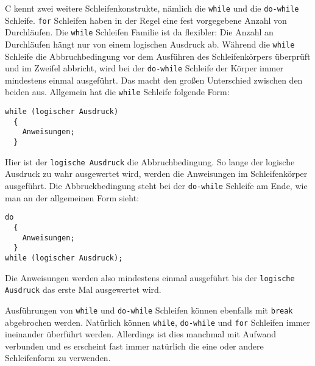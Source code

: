 C kennt zwei weitere Schleifenkonstrukte, nämlich die \verb|while| und die \verb|do-while| Schleife.
\texttt{for} Schleifen haben in der Regel eine fest vorgegebene Anzahl von Durchläufen.
Die \texttt{while} Schleifen Familie ist da flexibler: Die Anzahl an Durchläufen hängt nur von einem logischen Ausdruck ab.
Während die \verb|while| Schleife die Abbruchbedingung vor dem Ausführen des Schleifenkörpers überprüft und im Zweifel abbricht, wird bei der \verb|do-while| Schleife der Körper immer mindestens einmal ausgeführt.
Das macht den großen Unterschied zwischen den beiden aus.
Allgemein hat die \verb|while| Schleife folgende Form:
\begin{lstlisting}[caption={while Schleife}, belowcaptionskip=0.3em]
while (logischer Ausdruck)
  {
    Anweisungen;
  }
\end{lstlisting}
Hier ist der \texttt{logische Ausdruck} die Abbruchbedingung.
So lange der logische Ausdruck zu wahr ausgewertet wird, werden die Anweisungen im Schleifenkörper ausgeführt.
Die Abbruckbedingung steht bei der \verb|do-while| Schleife am Ende, wie man an der allgemeinen Form sieht:
\begin{lstlisting}[caption={do-while Schleife}, belowcaptionskip=0.3em]
do
  {
    Anweisungen;
  }
while (logischer Ausdruck);
\end{lstlisting}
Die Anweisungen werden also mindestens einmal ausgeführt bis der \texttt{logische Ausdruck} das erste Mal ausgewertet wird.

Ausführungen von \verb|while| und \verb|do-while| Schleifen können ebenfalls mit \verb|break| abgebrochen werden.
Natürlich können \verb|while|, \verb|do-while| und \verb|for| Schleifen immer ineinander überführt werden.
Allerdings ist dies manchmal mit Aufwand verbunden und es erscheint fast immer natürlich die eine oder andere Schleifenform zu verwenden.
\endinput
